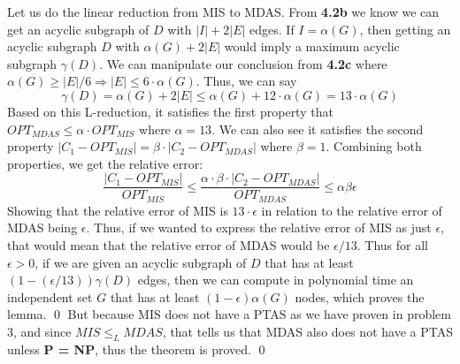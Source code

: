 \documentclass[oneside]{homework} %
\begin{document}
Let us do the linear reduction from MIS to MDAS. From \textbf{4.2b} we know we can get an acyclic subgraph of $D$ with $|I| + 2|E|$ edges. If $I = \alpha(G)$, then getting an acyclic subgraph $D$ with $\alpha(G) + 2|E|$ would imply a maximum acyclic subgraph $\gamma(D)$. We can manipulate our conclusion from \textbf{4.2c} where $\alpha(G) \geq |E|/6 \Longrightarrow |E| \leq 6\cdot\alpha(G)$. Thus, we can say $$\gamma(D) = \alpha(G) + 2|E| \leq \alpha(G) + 12\cdot\alpha(G) = 13\cdot\alpha(G)$$ Based on this L-reduction, it satisfies the first property that $OPT_{MDAS} \leq \alpha \cdot OPT_{MIS}$ where $\alpha = 13$. We can also see it satisfies the second property $|C_1 - OPT_{MIS}| = \beta\cdot|C_2 - OPT_{MDAS}|$ where $\beta = 1$. Combining both properties, we get the relative error: $$\frac{|C_1 - OPT_{MIS}|}{OPT_{MIS}} \leq \frac{\alpha\cdot\beta\cdot|C_2 - OPT_{MDAS}|}{OPT_{MDAS}} \leq \alpha\beta\epsilon$$ Showing that the relative error of MIS is $13\cdot \epsilon$ in relation to the relative error of MDAS being $\epsilon$. Thus, if we wanted to express the relative error of MIS as just $\epsilon$, that would mean that the relative error of MDAS would be $\epsilon/13$. Thus for all $\epsilon > 0$, if we are given an acyclic subgraph of $D$ that has at least $(1-(\epsilon/13))\gamma(D)$ edges, then we can compute in polynomial time an independent set $G$ that has at least $(1-\epsilon)\alpha(G)$ nodes, which proves the lemma. \hfill\qed
\newline
\newline
But because MIS does not have a PTAS as we have proven in problem 3, and since $MIS \leq_L MDAS$, that tells us that MDAS also does not have a PTAS unless \textbf{P = NP}, thus the theorem is proved. \hfill\qed
\end{document}
